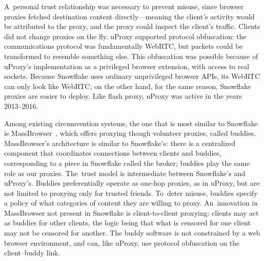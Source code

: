 \documentclass[letterpaper,twocolumn]{article}
\begin{document}
A~personal trust relationship was necessary to prevent misuse,
since browser proxies fetched destination content directly---meaning
the client's activity would be attributed to the proxy,
and the proxy could inspect the client's traffic.
Clients did not change proxies on the fly.
uProxy supported protocol obfuscation:
the communications protocol was fundamentally WebRTC,
but packets could be transformed to resemble something else.
This obfuscation was possible because of
uProxy's implementation as a privileged browser extension,
with access to real sockets.
Because Snowflake uses ordinary unprivileged browser APIs,
its WebRTC can only look like WebRTC;
on the other hand, for the same reason,
Snowflake proxies are easier to deploy.
Like flash proxy, uProxy was active in the years
2013--2016.

Among existing circumvention systems,
the one that is most similar to Snowflake is MassBrowser~\cite{Nasr2020a},
which offers
proxying though volunteer proxies, called buddies.
MassBrowser's architecture is similar to Snowflake's:
there is a centralized component that coordinates
connections between clients and buddies,
corresponding to a piece in Snowflake called the broker;
buddies play the same role as our proxies.
The~trust model is intermediate between Snowflake's and uProxy's.
Buddies preferentially operate as one-hop proxies, as in uProxy,
but are not limited to proxying only for trusted friends.
To~deter misuse, buddies specify a policy of
what categories of content they are willing to proxy.
An~innovation in MassBrowser not present in Snowflake is client-to-client proxying:
clients may act as buddies for other clients,
the logic being that what is censored for one client may not be censored for another.
The buddy software is
not constrained by a web browser environment,
and can, like uProxy, use protocol obfuscation
on the client--buddy link.
\end{document}

